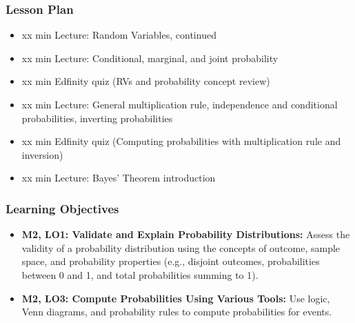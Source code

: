 \begin{frame}
    \frametitle{Lesson Plan}
    \begin{itemize}
        \item xx min Lecture: Random Variables, continued
        \item xx min Lecture: Conditional, marginal, and joint probability
        \item xx min Edfinity quiz (RVs and probability concept review)
        \item xx min Lecture: General multiplication rule, independence and conditional probabilities, inverting probabilities
        \item xx min Edfinity quiz (Computing probabilities with multiplication rule and inversion)
        \item xx min Lecture: Bayes' Theorem introduction
    \end{itemize}
\end{frame}

\begin{frame}
    \frametitle{Learning Objectives}
    \begin{itemize}
        \item \textbf{M2, LO1: Validate and Explain Probability Distributions:} Assess the validity of a probability distribution using the concepts of outcome, sample space, and probability properties (e.g., disjoint outcomes, probabilities between 0 and 1, and total probabilities summing to 1).
        \item \textbf{M2, LO3: Compute Probabilities Using Various Tools:} Use logic, Venn diagrams, and probability rules to compute probabilities for events.
    \end{itemize}
\end{frame}